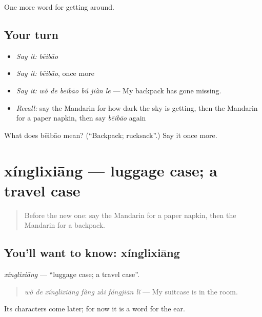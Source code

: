 \begin{grammarlens}[title={What you've built}]
One more word for getting around.
\end{grammarlens}

\subsection*{Your turn}
\begin{itemize}
\raggedright
  \item \emph{Say it:} \emph{bēibāo}
  \item \emph{Say it:} \emph{bēibāo}, once more
  \item \emph{Say it:} \emph{wǒ de bēibāo bú jiàn le} — My backpack has gone missing.
  \item \emph{Recall:} say the Mandarin for how dark the sky is getting, then the Mandarin for a paper napkin, then say \emph{bēibāo} again
\end{itemize}

\begin{tcolorbox}[breakable,colback=teal!4,colframe=teal!35!black,title={Before you move on}]
What does bēibāo mean? (\textquotedblleft{}Backpack; rucksack\textquotedblright{}.) Say it once more.
\end{tcolorbox}
\section[xínglixiāng]{xínglixiāng — luggage case; a travel case}

\label{lesson:ZH-C453-xinglixiang}



\begin{quote}
Before the new one: say the Mandarin for a paper napkin, then the Mandarin for a backpack.
\end{quote}

\subsection*{You'll want to know: xínglixiāng}
\emph{xínglixiāng} — \textquotedblleft{}luggage case; a travel case\textquotedblright{}.

\begin{quote}
\emph{wǒ de xínglixiāng fàng zài fángjiān lǐ} — My suitcase is in the room.
\end{quote}

Its characters come later; for now it is a word for the ear.

